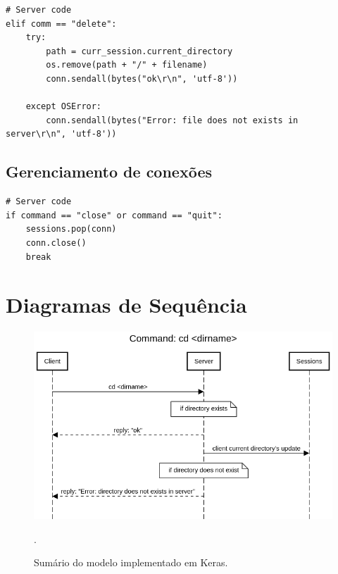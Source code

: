 \documentclass[conference]{IEEEtran}
\begin{document}
\begin{lstlisting}
# Server code
elif comm == "delete":
	try:
		path = curr_session.current_directory
	    os.remove(path + "/" + filename)
	    conn.sendall(bytes("ok\r\n", 'utf-8'))

	except OSError:
	    conn.sendall(bytes("Error: file does not exists in server\r\n", 'utf-8'))
\end{lstlisting}

\subsection{Gerenciamento de conexões}

\begin{lstlisting}
# Server code
if command == "close" or command == "quit":
	sessions.pop(conn)
	conn.close()
	break
\end{lstlisting}

\section{Diagramas de Sequência}

\begin{figure}[htbp]
\centering
\centerline{\includegraphics[scale=0.3]{diagrams/Command_cd_dirname.png}}
\caption{Sumário do modelo implementado em Keras.}.
\label{summary}
\end{figure}
\end{document}
